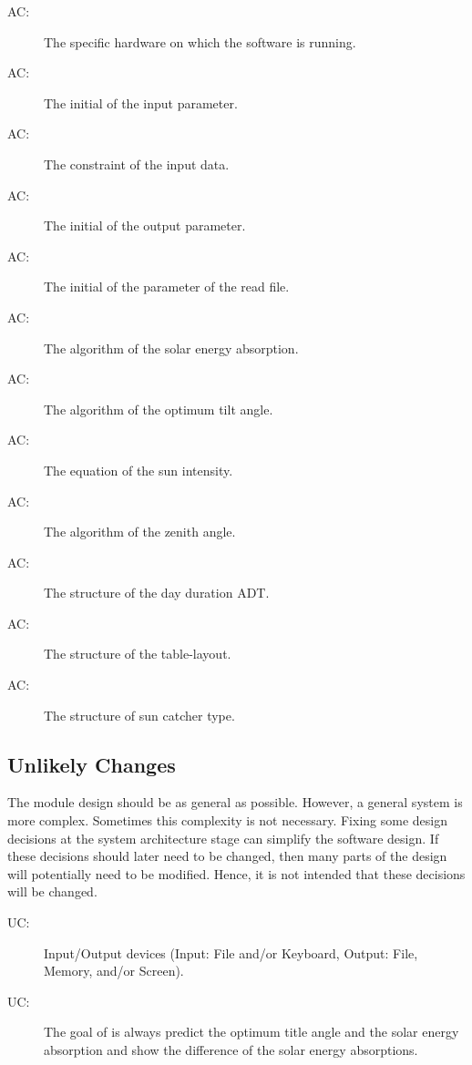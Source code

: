 \documentclass[12pt, titlepage]{article}
\newcounter{acnum}
\newcommand{\actheacnum}{AC\theacnum}
\newcounter{ucnum}
\newcommand{\uctheucnum}{UC\theucnum}
\begin{document}
\begin{description}
\item[ \actheacnum \label{acH}:] The specific
  hardware on which the software is running.
\item[ \actheacnum \label{acIP}:] The initial of the
  input parameter.
\item[ \actheacnum \label{acIC}:] The constraint of the input data.
\item[ \actheacnum \label{acO}:] The initial of the
  output parameter.
\item[ \actheacnum \label{acR}:] The initial of the
  parameter of the read file.
\item[ \actheacnum \label{acSEA}:] The algorithm of the
 solar energy absorption.
\item[ \actheacnum \label{acOTP}:] The algorithm of the 
optimum tilt angle.
\item[ \actheacnum \label{acSI}:] The equation of the sun
intensity.
\item[ \actheacnum \label{acZA}:] The algorithm of the
 zenith angle.
\item[ \actheacnum \label{acDD}:] The structure of the 
day duration ADT.
\item[ \actheacnum \label{acT}:] The structure of 
the table-layout.
\item[ \actheacnum \label{acSCT}:]  The structure of 
sun catcher type.
\end{description}

\subsection{Unlikely Changes} \label{SecUchange}

The module design should be as general as possible. However, a general system
is more complex. Sometimes this complexity is not necessary. Fixing some design
decisions at the system architecture stage can simplify the software design. If
these decisions should later need to be changed, then many parts of the design
will potentially need to be modified. Hence, it is not intended that these
decisions will be changed.

\begin{description}
\item[ \uctheucnum \label{ucIO}:] Input/Output devices
  (Input: File and/or Keyboard, Output: File, Memory, and/or Screen).
\item[ \uctheucnum \label{ucIO}:] The goal of \progname
is always predict the optimum title angle and the solar energy absorption and show the difference of the solar energy absorptions.
\end{description}
\end{document}
